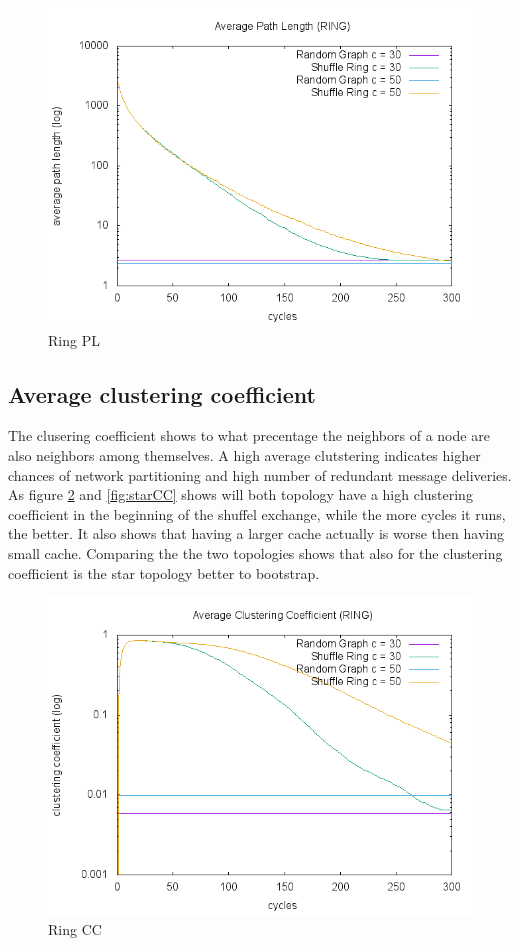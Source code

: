 \documentclass[UKenglish]{article}  %
\begin{document}
\begin{figure}
\includegraphics[scale=0.6]{plot/ringPL.png}
	\caption{Ring PL}
	\label{fig:ringPL}
\end{figure}


\subsection{Average clustering coefficient}
The clusering coefficient shows to what precentage the neighbors of a node are also neighbors among themselves. A high average clutstering indicates higher chances of network partitioning and high number of redundant message deliveries. As figure \ref{fig:ringCC} and \ref{fig:starCC} shows will both topology have a high clustering coefficient in the beginning of the shuffel exchange, while the more cycles it runs, the better. It also shows that having a larger cache actually is worse then having small cache. Comparing the the two topologies shows that also for the clustering coefficient is the star topology better to bootstrap. 
\begin{figure}
\includegraphics[scale=0.6]{plot/ringCC.png}
	\caption{Ring CC}
	\label{fig:ringCC}
\end{figure}
\end{document}
